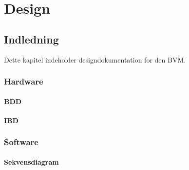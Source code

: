 
\chapter{Design}

\section{Indledning}

Dette kapitel indeholder designdokumentation for den BVM. 

\subsection{Hardware}

\subsubsection{BDD}
\subsubsection{IBD}




\subsection{Software }

\subsubsection{Sekvensdiagram}

